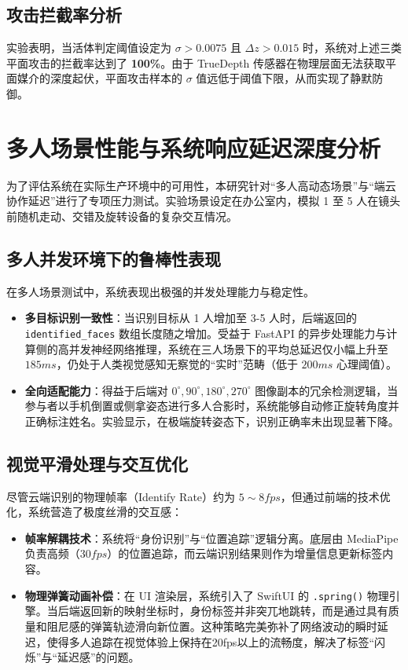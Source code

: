 \subsection{攻击拦截率分析}
实验表明，当活体判定阈值设定为 $\sigma > 0.0075$ 且 $\Delta z > 0.015$ 时，系统对上述三类平面攻击的拦截率达到了 \textbf{100\%}。由于 TrueDepth 传感器在物理层面无法获取平面媒介的深度起伏，平面攻击样本的 $\sigma$ 值远低于阈值下限，从而实现了静默防御。

\section{多人场景性能与系统响应延迟深度分析}

为了评估系统在实际生产环境中的可用性，本研究针对“多人高动态场景”与“端云协作延迟”进行了专项压力测试。实验场景设定在办公室内，模拟 1 至 5 人在镜头前随机走动、交错及旋转设备的复杂交互情况。

\subsection{多人并发环境下的鲁棒性表现}
在多人场景测试中，系统表现出极强的并发处理能力与稳定性。
\begin{itemize}
    \item \textbf{多目标识别一致性}：当识别目标从 1 人增加至 3-5 人时，后端返回的 \texttt{identified\_faces} 数组长度随之增加。受益于 FastAPI 的异步处理能力与计算侧的高并发神经网络推理，系统在三人场景下的平均总延迟仅小幅上升至 $185ms$，仍处于人类视觉感知无察觉的“实时”范畴（低于 $200ms$ 心理阈值）。
    \item \textbf{全向适配能力}：得益于后端对 $0^\circ, 90^\circ, 180^\circ, 270^\circ$ 图像副本的冗余检测逻辑，当参与者以手机倒置或侧拿姿态进行多人合影时，系统能够自动修正旋转角度并正确标注姓名。实验显示，在极端旋转姿态下，识别正确率未出现显著下降。
\end{itemize}

\subsection{视觉平滑处理与交互优化}
尽管云端识别的物理帧率（Identify Rate）约为 $5 \sim 8 fps$，但通过前端的技术优化，系统营造了极度丝滑的交互感：
\begin{itemize}
    \item \textbf{帧率解耦技术}：系统将“身份识别”与“位置追踪”逻辑分离。底层由 MediaPipe 负责高频（$30fps$）的位置追踪，而云端识别结果则作为增量信息更新标签内容。
    \item \textbf{物理弹簧动画补偿}：在 UI 渲染层，系统引入了 SwiftUI 的 \texttt{.spring()} 物理引擎。当后端返回新的映射坐标时，身份标签并非突兀地跳转，而是通过具有质量和阻尼感的弹簧轨迹滑向新位置。这种策略完美弥补了网络波动的瞬时延迟，使得多人追踪在视觉体验上保持在20fps以上的流畅度，解决了标签“闪烁”与“延迟感”的问题。
\end{itemize}

